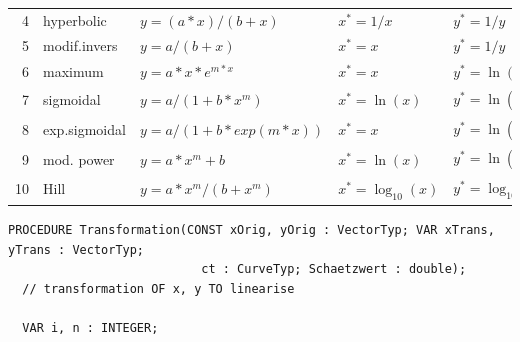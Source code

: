 \begin{refsection}
\begin{table}
\begin{tabular}{rllllllll}
  4 & hyperbolic          & \(y=(a*x)/(b+x) \)      & \(x^* = 1/x \)          & \(y^* = 1/y \)                                & \(y^4 \)                                                     & \(1/a^* \)          & \(b^* a \)     &        \\
  5 & modif.invers        & \(y=a/(b+x) \)          & \(x^* = x \)            & \(y^* = 1/y \)                                & \(y^4 \)                                                     & \(1/b^* \)          & \(a^* a \)     &        \\
  6 & maximum             & \(y=a*x*e^{m*x} \)      & \(x^* = x \)            & \(y^* = \ln(x/y) \)                           & \((x * y)^2 / (y - x)^2 \)                                   & \(\exp(-a^*) \)     &             & \(-b^* \) \\
 \midrule
  7 & sigmoidal           & \(y=a/(1+b*x^m) \)      & \(x^* = \ln(x) \)       & \(y^* = \ln(y_\mathrm{max}/y - 1) \)          & \((y_\mathrm{max}/y - 1)^2 / (y_\mathrm{max} / y^2)^2 \)     & \(y_\mathrm{max} \) & \(\exp(a^*) \) & \(b^* \)  \\
  8 & exp.sigmoidal       & \(y=a/(1+b*exp(m*x)) \) & \(x^* = x \)            & \(y^* = \ln(y_\mathrm{max}/y - 1) \)          & \((y_\mathrm{max}/y - 1)^2 / (y_\mathrm{max} / y^2)^2 \)     & \(y_\mathrm{max} \) & \(\exp(a^*) \) & \(b^* \)  \\
  9 & mod. power          & \(y=a*x^m +b \)         & \(x^* = \ln(x) \)       & \(y^* = \ln(y - y_{x=0}) \)                   & \((y - y_{x=0})^2 \)                                         & \(y_{x=0} \)        & \(\exp(a^*) \) & \(b^* \)  \\
 10 & Hill                & \(y=a*x^m / (b+x^m) \)  & \(x^* = \log_{10}(x) \) & \(y^* = \log_{10}(y/ (y_\mathrm{max} - y)) \) & \(y^2 / \log_{10}(\mathrm{e} * (y_\mathrm{max}^2 - y))^2 \)  & \(y_\mathrm{max} \) & \(10^{-a} \)   & \(b^* \)  \\
 \bottomrule
 \end{tabular}
\end{table}

\begin{lstlisting}[caption=Linearisation of curved data]
  PROCEDURE Transformation(CONST xOrig, yOrig : VectorTyp; VAR xTrans, yTrans : VectorTyp;
                           ct : CurveTyp; Schaetzwert : double);
  // transformation OF x, y TO linearise

  VAR i, n : INTEGER;


\end{lstlisting}
\end{refsection}
